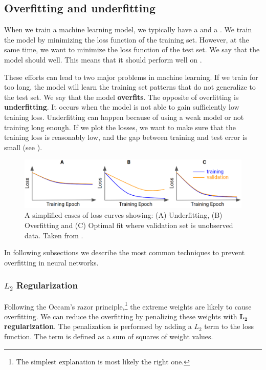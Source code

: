 
\subsection{Overfitting and underfitting}
When we train a machine learning model, we typically have a  
and a . We train the model by minimizing the loss function of the 
training set. However, at the same time, we want to minimize the loss function of 
the test set. We say that the model should  well. This means 
that it should perform well on .

These efforts can lead to two major problems in machine learning. If we train
for too long, the model will learn the training set patterns that do not
generalize to the test set. We say that the model \textbf{overfits}. The
opposite of overfitting is \textbf{underfitting}. It occurs when the model is
not able to gain sufficiently low training loss. Underfitting can happen because
of using a weak model or not training long enough. If we plot the losses, we
want to make sure that the training loss is reasonably low, and the gap between
training and test error is small (see ).

\begin{figure}[h]
    \centering
    \includegraphics[width=\linewidth]{Sources/Figures/fitting.png}
    \caption{A simplified cases of loss curves showing:
        (A) Underfitting, (B) Overfitting and (C) Optimal fit where validation
        set is unobserved data. Taken from
        \cite{bileschi2020deep}.}
    \label{fig:loss_plot}
\end{figure}

In following subsections we describe the most common techniques to prevent
overfitting in neural networks.

\subsubsection{$L_2$ Regularization}
Following the Occam's razor principle,\footnote{The simplest explanation is most
    likely the right one.} the extreme weights are likely to cause overfitting. We
can reduce the overfitting by penalizing these weights with $\boldsymbol{L_2}$
\textbf{regularization}. The penalization is performed by adding a $L_2$ term to
the loss function. The term is defined as a sum of squares of weight values.

